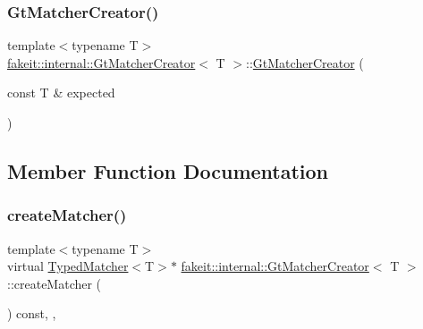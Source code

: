 \mbox{\label{structfakeit_1_1internal_1_1GtMatcherCreator_ae89b4225c99c65c7fab77f93fea6c7c7}} 
\subsubsection{\texorpdfstring{GtMatcherCreator()}{GtMatcherCreator()}\hspace{0.1cm}{\footnotesize\ttfamily [9/9]}}
{\footnotesize\ttfamily template$<$typename T$>$ \\
\mbox{\hyperlink{structfakeit_1_1internal_1_1GtMatcherCreator}{fakeit\+::internal\+::\+Gt\+Matcher\+Creator}}$<$ T $>$\+::\mbox{\hyperlink{structfakeit_1_1internal_1_1GtMatcherCreator}{Gt\+Matcher\+Creator}} (\begin{DoxyParamCaption}\item[{const T \&}]{expected }\end{DoxyParamCaption})\hspace{0.3cm}{\ttfamily [inline]}}



\subsection{Member Function Documentation}
\mbox{\label{structfakeit_1_1internal_1_1GtMatcherCreator_ae7b905660b8aac92b70c783063c1ebdd}} 
\subsubsection{\texorpdfstring{createMatcher()}{createMatcher()}\hspace{0.1cm}{\footnotesize\ttfamily [1/9]}}
{\footnotesize\ttfamily template$<$typename T$>$ \\
virtual \mbox{\hyperlink{structfakeit_1_1TypedMatcher}{Typed\+Matcher}}$<$T$>$$\ast$ \mbox{\hyperlink{structfakeit_1_1internal_1_1GtMatcherCreator}{fakeit\+::internal\+::\+Gt\+Matcher\+Creator}}$<$ T $>$\+::create\+Matcher (\begin{DoxyParamCaption}{ }\end{DoxyParamCaption}) const\hspace{0.3cm}{\ttfamily [inline]}, {\ttfamily [override]}, {\ttfamily [virtual]}}



